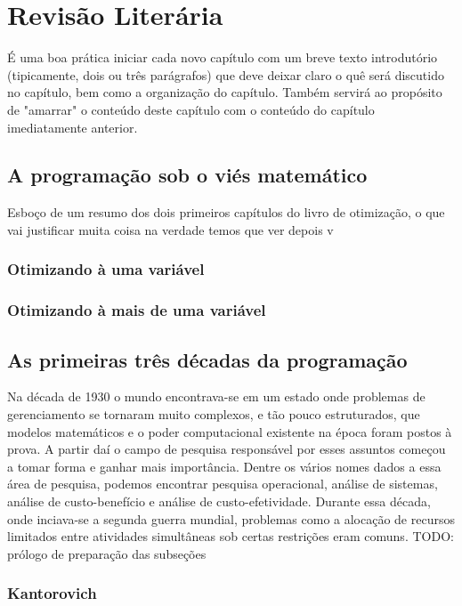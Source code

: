 
\chapter{\larger Revisão Literária}
\label{chap:fundamentacaoTeorica}

É uma boa prática iniciar cada novo capítulo com um breve texto introdutório (tipicamente, dois ou três parágrafos) que deve deixar claro o quê será discutido no capítulo, bem como a organização do capítulo.
Também servirá ao propósito de "amarrar"{} o conteúdo deste capítulo com o conteúdo do capítulo imediatamente anterior.

\section{A programação sob o viés matemático}
Esboço de um resumo dos dois primeiros capítulos do livro de otimização, o que vai justificar muita coisa na verdade temos que ver depois v
\subsection{Otimizando à uma variável}
\subsection{Otimizando à mais de uma variável}

\section{As primeiras três décadas da programação}

Na década de 1930 o mundo encontrava-se em um estado onde problemas de gerenciamento
se tornaram muito complexos, e tão pouco estruturados, que modelos matemáticos e o poder
computacional existente na época foram postos à prova. A partir daí o campo de
pesquisa responsável por esses assuntos começou a tomar forma e ganhar mais importância.
Dentre os vários nomes dados a essa área de pesquisa, podemos encontrar pesquisa operacional,
análise de sistemas, análise de custo-benefício e análise de custo-efetividade. Durante essa
década, onde inciava-se a segunda guerra mundial, problemas como a alocação de recursos
limitados entre atividades simultâneas sob certas restrições eram comuns.
TODO: prólogo de preparação das subseções


\subsection{Kantorovich}

